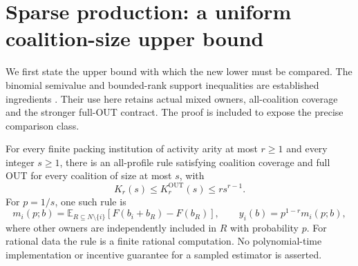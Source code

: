 \section{Sparse production: a uniform coalition-size upper bound}\label{sec:upper}
We first state the upper bound with which the new lower must be compared.
The binomial semivalue and bounded-rank support inequalities are established
ingredients \citep{FeigeEtAl2014,EzraEtAl2018,Casajus2011}. Their use here retains
actual mixed owners, all-coalition coverage and the stronger full-OUT contract.
The proof is included to expose the precise comparison class.

\begin{theorem}\label{thm:sparse-upper}
For every finite packing institution of activity arity at most $r\ge1$ and
every integer $s\ge1$, there is an all-profile rule satisfying coalition
coverage and full OUT for every coalition of size at most $s$, with
\begin{equation}\label{eq:sparse-upper}
 K_r(s)\le K_r^{\mathrm{OUT}}(s)\le r s^{r-1}.
\end{equation}
For $p=1/s$, one such rule is
\begin{equation}\label{eq:semivalue}
 m_i(p;b)=\mathbb E_{R\subseteq N\setminus\{i\}}
       [F(b_i+b_R)-F(b_R)],\qquad y_i(b)=p^{1-r}m_i(p;b),
\end{equation}
where other owners are independently included in $R$ with probability $p$.
For rational data the rule is a finite rational computation. No
polynomial-time implementation or incentive guarantee for a sampled estimator
is asserted.
\end{theorem}

